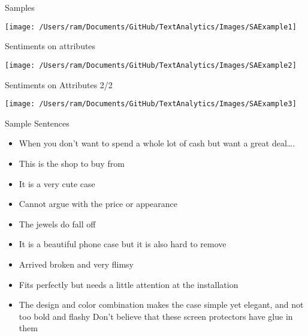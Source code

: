 \begin{frame}{Samples}
\begin{center}
\texttt{[image: /Users/ram/Documents/GitHub/TextAnalytics/Images/SAExample1]}
\end{center}

\end{frame}

\begin{frame}{Sentiments on attributes}
\begin{center}
\texttt{[image: /Users/ram/Documents/GitHub/TextAnalytics/Images/SAExample2]}
\end{center}

\end{frame}

\begin{frame}{Sentiments on Attributes 2/2}
\begin{center}
\texttt{[image: /Users/ram/Documents/GitHub/TextAnalytics/Images/SAExample3]}
\end{center}

\end{frame}


\begin{frame}{Sample Sentences}
\begin{itemize}
\item When you don’t want to spend a whole lot of cash but want a great deal….
\item This is the shop to buy from
\item It is a very cute case
\item Cannot argue with the price or appearance
\item The jewels do fall off
\item It is a beautiful phone case but it is also hard to remove
\item Arrived broken and very flimsy
\item Fits perfectly but needs a little attention at the installation
\item The design and color combination makes the case simple yet elegant, and not too bold and flashy
Don’t believe that these screen protectors have glue in them
\end{itemize}
\end{frame}


